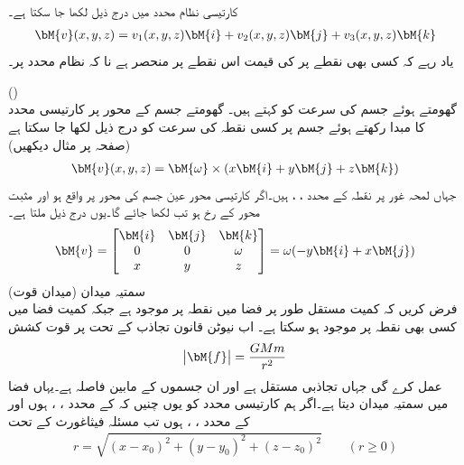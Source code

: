 کارتیسی نظام محدد میں درج ذیل لکھا جا سکتا ہے۔
\begin{align*}
\bM{v}(x,y,z)=v_1(x,y,z)\bM{i}+v_2(x,y,z)\bM{j}+v_3(x,y,z)\bM{k}
\end{align*} 
یاد رہے کہ کسی بھی نقطے پر   کی قیمت  اس نقطے پر منحصر ہے نا کہ نظام محدد پر۔

\quad {} ()\\
گھومتے ہوئے جسم  کی   سرعت  کو  کہتے ہیں۔ گھومتے جسم کے محور پر کارتیسی محدد کا مبدا رکھتے ہوئے جسم پر کسی نقطہ   کی سرعت کو درج ذیل لکھا جا سکتا ہے (صفحہ  پر مثال  دیکھیں)
\begin{align} 
\bM{v}(x,y,z)=\bM{\omega} \times (x\bM{i}+y\bM{j}+z\bM{k})
\end{align} 
جہاں لمحہ غور پر نقطہ   کے محدد  ، ،  ہیں۔اگر کارتیسی محور  عین جسم کی محور پر واقع ہو اور  مثبت محور   کے رخ ہو تب  لکھا جائے گا۔یوں درج ذیل ملتا ہے۔
\begin{align}
\bM{v}=\begin{bmatrix} \bM{i}&\bM{j}&\bM{k}\\0&0&\omega\\x&y&z \end{bmatrix}=\omega (-y\bM{i}+x\bM{j})
\end{align}
\quad سمتیہ میدان (میدان قوت)\\
فرض کریں کہ کمیت   مستقل طور پر فضا میں نقطہ  پر موجود ہے جبکہ کمیت  فضا میں کسی بھی نقطہ  پر موجود ہو سکتا ہے۔ اب نیوٹن قانون تجاذب  کے تحت  پر قوت کشش
\begin{align}
\abs{\bM{f}}=\frac{GMm}{r^2}
\end{align}
عمل کرے گی جہاں  تجاذبی مستقل ہے اور  ان جسموں کے مابین فاصلہ ہے۔یہاں  فضا میں سمتیہ میدان دیتا ہے۔اگر ہم کارتیسی محدد کو یوں چنیں کہ  کے محدد ، ،  ہوں اور  کے محدد ، ،  ہوں تب مسئلہ فیثاغورث کے تحت 
\begin{align*}
r=\sqrt{(x-x_0)^2+(y-y_0)^2+(z-z_0)^2}\quad \quad (r\ge 0)
\end{align*}
